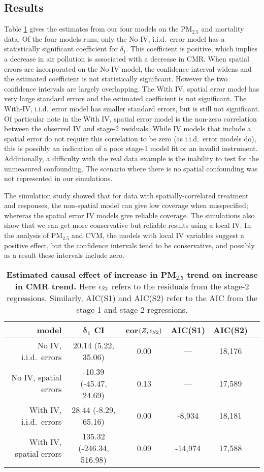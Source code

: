 \documentclass[12pt]{article}
\begin{document}
\subsection{Results}\label{ss3:results}

Table \ref{realTable} gives the estimates from our four models on the PM$_{2.5}$ and mortality data. Of the four models runs, only the No IV, i.i.d.~error model has a statistically significant coefficient for $\delta_1$. This coefficient is positive, which implies a decrease in air pollution is associated with a decrease in CMR. When spatial errors are incorporated on the No IV model, the confidence interval widens  and the estimated coefficient is not statistically significant. However the two confidence intervals are largely overlapping. The With IV, spatial error model has very large standard errors and the estimated coefficient is not significant.  The  With-IV, i.i.d.\ error model has smaller standard errors, but is still not significant. Of particular note in the With IV, spatial error model is the non-zero correlation between the observed IV and stage-2 residuals. While IV models that include a spatial error do not require this correlation to be zero (as i.i.d.~error models do), this is possibly an indication of a poor stage-1 model fit or an invalid instrument. Additionally, a difficulty with the real data example is the inability to test for the unmeasured confounding. The scenario where there is no spatial confounding was not represented in our simulations.

The simulation study showed that for data with spatially-correlated treatment and responses, the non-spatial model can give low coverage when misspecified; whereras the spatial error IV models give reliable coverage. The simulations also show that we can get more conservative but reliable results using a local IV. In the analysis of PM$_{2.5}$ and CVM,  the models with local IV variables suggest a positive effect, but the confidence intervals tend to be conservative, and possibly as a result these intervals include zero.

\begin{table}
\caption{\textbf{Estimated causal effect of increase in PM$_{2.5}$ trend on increase in CMR trend.} Here $\epsilon_{S2}$ refers to the residuals from the stage-2 regressions. Similarly, AIC(S1) and AIC(S2) refer to the AIC from the stage-1 and stage-2 regressions.}
\label{realTable}
\footnotesize
\centering
\begin{tabular}{r|ccccc}
\hline
model & $\boldsymbol{\delta_1}$ CI & cor$(Z,\epsilon_{S2})$ & AIC(S1) & AIC(S2) \\
\hline
No IV, i.i.d.~errors & 20.14 (5.22, 35.06) & 0.00 &  --- & 18,176 \\ 
No IV, spatial errors & -10.39 (-45.47, 24.69) & 0.13 &  --- & 17,589 \\ 
With IV, i.i.d.~errors & 28.44 (-8.29, 65.16) & 0.00 & -8,934&18,181\\  
With IV, spatial errors & 135.32 (-246.34, 516.98) & 0.09 & -14,974&17,588\\ 
\hline
\end{tabular}
\end{table}
\end{document}
